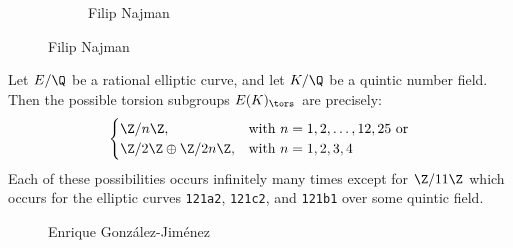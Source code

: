 \begin{frame}[plain]
\begin{figure}[h]
\begin{subfigure}{0.20\textwidth}
	\end{subfigure} \quad
	\begin{subfigure}{0.20\textwidth}
	\captionsetup{labelformat=empty}
	\centering
	\caption{\tiny Filip Najman}
	\end{subfigure}
	\end{figure}
\end{frame}





\begin{frame}[plain]
\begin{thm}
Let $E/\Q$ be a rational elliptic curve, and let $K/\Q$ be a quintic number field. Then the possible torsion subgroups $E(K)_\tors$ are precisely:
	\[
	\begin{cases}
	\Z/n\Z, & \text{with } n= 1, 2, \ldots, 12, 25 \text{ or} \\
	\Z/2\Z \oplus \Z/2n\Z, & \text{with } n= 1, 2, 3, 4
	\end{cases}
	\]
Each of these possibilities occurs infinitely many times except for $\Z/11\Z$ which occurs for the elliptic curves \texttt{121a2}, \texttt{121c2}, and \texttt{121b1} over some quintic field. 
\end{thm}
	\begin{figure}[!ht]
	\centering
	\captionsetup{labelformat=empty}
	\caption{Enrique Gonz\'alez-Jim\'enez}
	\end{figure}
\end{frame}





